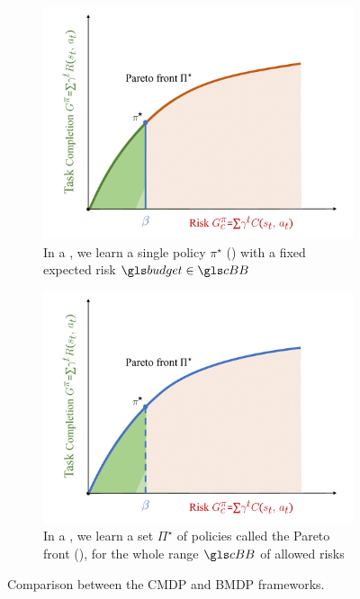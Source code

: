 \begin{figure}[ht]
\begin{subfigure}[t]{0.48\linewidth}
	\includegraphics[width=\linewidth]{img/pareto2}
	\caption{In a , we learn a single policy $\pi^\star$ () with a fixed expected risk $\budget\in\budgetspace$}
	\label{fig:cmdp}
\end{subfigure}\hfill
\begin{subfigure}[t]{0.48\linewidth}
	\includegraphics[width=\linewidth]{img/pareto3}
	\caption{In a , we learn a set $\Pi^\star$ of policies called the Pareto front (), for the whole range $\budgetspace$ of allowed risks}
	\label{fig:bmdp}
\end{subfigure}
\caption{Comparison between the \gls{CMDP} and \gls{BMDP} frameworks.}
\end{figure}

